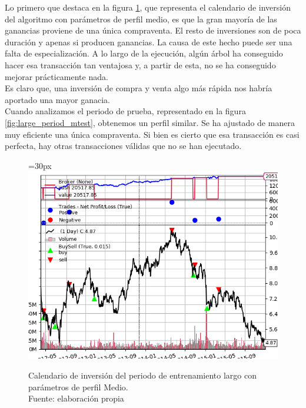 Lo primero que destaca en la figura \ref{fig:large_period_mtrain}, que representa el calendario de inversi\'on del algoritmo con par\'ametros de perfil medio, es que la gran mayor\'ia de las ganancias proviene de una \'unica compraventa. El resto de inversiones son de poca duraci\'on y apenas si producen ganancias. La causa de este hecho puede ser una falta de especializaci\'on. A lo largo de la ejecuci\'on, alg\'un \'arbol ha conseguido hacer esa transacci\'on tan ventajosa y, a partir de esta, no se ha conseguido mejorar pr\'acticamente nada.\\

Es claro que, una inversi\'on de compra y venta algo m\'as r\'apida nos habr\'ia aportado una mayor ganacia.\\

Cuando analizamos el periodo de prueba, representado en la figura \ref{fig:large_period_mtest}, obtenemos un perfil similar. Se ha ajustado de manera muy eficiente una \'unica compraventa. Si bien es cierto que esa transacci\'on es casi perfecta, hay otras transacciones v\'alidas que no se han ejecutado.\\

     	\begin{figure}[H]
     		\centering\leftskip=30px
     		\includegraphics[scale=0.72]{imagenes/L_Medium_train.png}
     		\caption[Calendario de inversi\'on del periodo de entrenamiento largo.]{Calendario de inversi\'on del periodo de entrenamiento largo con par\'ametros de perfil Medio.\\ Fuente: elaboraci\'on propia}
     		\label{fig:large_period_mtrain}
     	\end{figure}
     	
